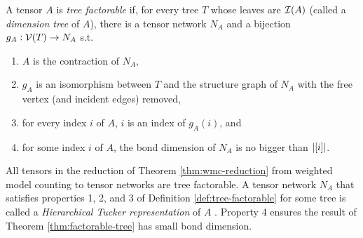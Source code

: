 
\begin{definition} \label{def:tree-factorable}
A tensor $A$ is \emph{tree factorable} if, for every tree $T$ whose leaves are $\mathcal{I}(A)$ (called a \emph{dimension tree} of $A$), there is a tensor network $N_A$ and a bijection $g_A: \mathcal{V}(T) \rightarrow N_A$ s.t.
\begin{enumerate}
\item $A$ is the contraction of $N_A$,
\item $g_A$ is an isomorphism between $T$ and the structure graph of $N_A$ with the free vertex (and incident edges) removed,
\item for every index $i$ of $A$, $i$ is an index of $g_A(i)$, and
\item for some index $i$ of $A$, the bond dimension of $N_A$ is no bigger than $|[i]|$. %
\end{enumerate}
\end{definition}
All tensors in the reduction of Theorem \ref{thm:wmc-reduction} from weighted model counting to tensor networks are tree factorable. A tensor network $N_A$ that satisfies properties 1, 2, and 3 of Definition \ref{def:tree-factorable} for some tree is called a \emph{Hierarchical Tucker representation} of $A$ \cite{Grasedyck10}. Property 4 ensures the result of Theorem \ref{thm:factorable-tree} has small bond dimension.


